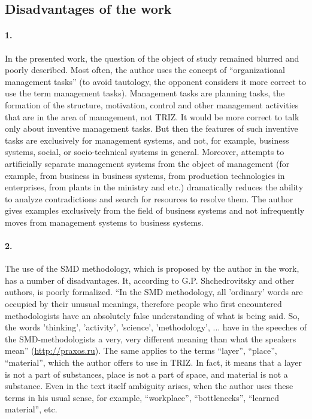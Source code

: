 \subsection*{Disadvantages of the work}

\paragraph{1.}
In the presented work, the question of the object of study remained blurred
and poorly described.  Most often, the author uses the concept of
“organizational management tasks” (to avoid tautology, the opponent considers
it more correct to use the term management tasks). Management tasks are
planning tasks, the formation of the structure, motivation, control and other
management activities that are in the area of management, not TRIZ. It would
be more correct to talk only about inventive management tasks. But then the
features of such inventive tasks are exclusively for management systems, and
not, for example, business systems, social, or socio-technical systems in
general.  Moreover, attempts to artificially separate management systems from
the object of management (for example, from business in business systems, from
production technologies in enterprises, from plants in the ministry and etc.)
dramatically reduces the ability to analyze contradictions and search for
resources to resolve them. The author gives examples exclusively from the
field of business systems and not infrequently moves from management systems
to business systems.

\paragraph{2.}
The use of the SMD methodology, which is proposed by the author in the work,
has a number of disadvantages. It, according to G.P. Shchedrovitsky and other
authors, is poorly formalized.  “In the SMD methodology, all 'ordinary' words
are occupied by their unusual meanings, therefore people who first encountered
methodologists have an absolutely false understanding of what is being said.
So, the words 'thinking', 'activity', 'science', 'methodology', ... have in
the speeches of the SMD-methodologists a very, very different meaning than
what the speakers mean” (\url{http://praxos.ru}). The same applies to the
terms “layer”, “place”, “material”, which the author offers to use in TRIZ. In
fact, it means that a layer is not a part of substances, place is not a part
of space, and material is not a substance. Even in the text itself ambiguity
arises, when the author uses these terms in his usual sense, for example,
“workplace”, “bottlenecks”, “learned material”, etc.

